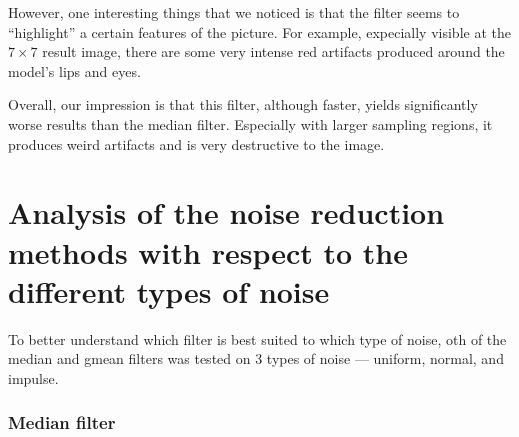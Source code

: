 \documentclass[12pt]{article}
\theoremstyle{definition}
\begin{document}
However, one interesting things that we noticed is that the filter seems to ``highlight'' a certain features of the picture.
For example, expecially visible at the $7\times7$ result image, there are some very intense red artifacts produced around the model's lips and eyes.

Overall, our impression is that this filter, although faster, yields significantly worse results than the median filter.
Especially with larger sampling regions, it produces weird artifacts and is very destructive to the image.

\section{Analysis of the noise reduction methods with respect to the different types of noise}

To better understand which filter is best suited to which type of noise,
oth of the median and gmean filters was tested on 3 types of noise --- uniform, normal, and impulse.

\subsubsection{Median filter}
\end{document}
